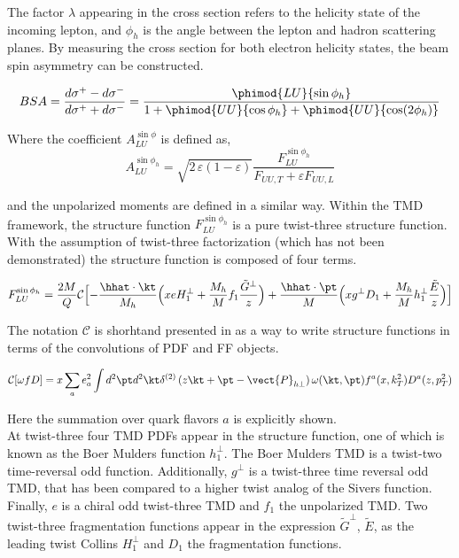 The factor $\lambda$ appearing in the cross section refers to the helicity state of the incoming lepton, and $\phi_h$ is the angle between the lepton and hadron scattering planes.  By measuring the cross section for both electron helicity states, the beam spin asymmetry can be constructed.  

\begin{equation}
  BSA = \frac{d\sigma^+ - d\sigma^-}{d\sigma^+ + d\sigma^-} = \frac{\phimod{LU}{\sin\phi_h}}{1 + \phimod{UU}{\cos\phi_h} + \phimod{UU}{\cos(2\phi_h)}}
\end{equation}

Where the coefficient $A_{LU}^{\sin\phi}$ is defined as, 
\begin{equation}
  A_{LU}^{\sin\phi_h} = \sqrt{2\,\varepsilon (1-\varepsilon)} \frac{F_{LU}^{\sin\phi_h}}{F_{UU,T} + \varepsilon F_{UU,L}}
\end{equation}

and the unpolarized moments are defined in a similar way.  Within the TMD framework, the structure function $F_{LU}^{\sin\phi_h}$ is a pure twist-three structure function.  With the assumption of twist-three factorization (which has not been demonstrated) the structure function is composed of four terms.

\begin{equation}
  F_{LU}^{\sin\phi_h} = \frac{2M}{Q} \mathcal{C} \Bigl[ -\frac{\hhat \cdot \kt}{M_h} \Bigl( xeH_1^\perp + \frac{M_h}{M} f_1 \frac{\tilde{G}^\perp}{z} \Bigr) + \frac{\hhat \cdot \pt}{M} \Bigl( xg^\perp D_1 + \frac{M_h}{M} h_{1}^{\perp} \frac{\tilde{E}}{z} \Bigr) \Bigr]
\end{equation}

The notation $\mathcal{C}$ is shorhtand  presented in \cite{tmds-bacchetta:2006} as a way to write structure functions in terms of the convolutions of PDF and FF objects.

\begin{equation}
  \mathcal{C}[\omega f D] = x \sum_{a} e^{2}_{a} \int d^{2}\pt d^{2}\kt \delta^{(2)} \left( z\kt + \pt - \vect{P}_{h\perp} \right) \omega (\kt, \pt) f^{a}(x, k_{T}^{2}) D^{a}(z, p_{T}^{2}) 
\end{equation}

Here the summation over quark flavors $a$ is explicitly shown. \\

At twist-three four TMD PDFs appear in the structure function, one of which is known as the Boer Mulders function $h_{1}^{\perp}$.  The Boer Mulders TMD is a twist-two time-reversal odd function.  Additionally, $g^{\perp}$ is a twist-three time reversal odd TMD, that has been compared to a higher twist analog of the Sivers function.  Finally, $e$ is a chiral odd twist-three TMD and $f_1$ the unpolarized TMD.  Two twist-three fragmentation functions appear in the expression $\tilde{G}^{\perp}$, $\tilde{E}$, as the leading twist Collins $H_{1}^{\perp}$ and $D_1$ the fragmentation functions. \\

